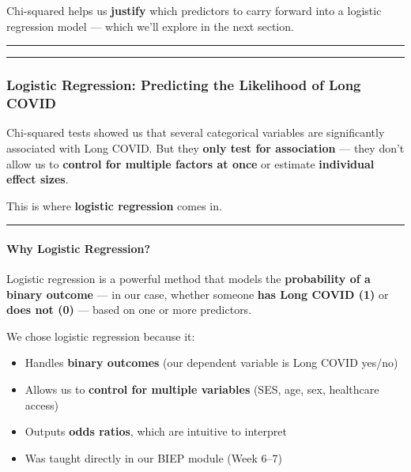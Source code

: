 \documentclass[
]{article}
\providecommand{\tightlist}{%
  \setlength{\itemsep}{0pt}\setlength{\parskip}{0pt}}
\begin{document}
Chi-squared helps us \textbf{justify} which predictors to carry forward
into a logistic regression model --- which we'll explore in the next
section.

\begin{center}\rule{0.5\linewidth}{0.5pt}\end{center}

\begin{center}\rule{0.5\linewidth}{0.5pt}\end{center}

\subsubsection{Logistic Regression: Predicting the Likelihood of Long
COVID}\label{logistic-regression-predicting-the-likelihood-of-long-covid}

Chi-squared tests showed us that several categorical variables are
significantly associated with Long COVID. But they \textbf{only test for
association} --- they don't allow us to \textbf{control for multiple
factors at once} or estimate \textbf{individual effect sizes}.

This is where \textbf{logistic regression} comes in.

\begin{center}\rule{0.5\linewidth}{0.5pt}\end{center}

\paragraph{Why Logistic Regression?}\label{why-logistic-regression}

Logistic regression is a powerful method that models the
\textbf{probability of a binary outcome} --- in our case, whether
someone \textbf{has Long COVID (1)} or \textbf{does not (0)} --- based
on one or more predictors.

We chose logistic regression because it:

\begin{itemize}
\tightlist
\item
  Handles \textbf{binary outcomes} (our dependent variable is Long COVID
  yes/no)
\item
  Allows us to \textbf{control for multiple variables} (SES, age, sex,
  healthcare access)
\item
  Outputs \textbf{odds ratios}, which are intuitive to interpret
\item
  Was taught directly in our BIEP module (Week 6--7)
\end{itemize}
\end{document}
